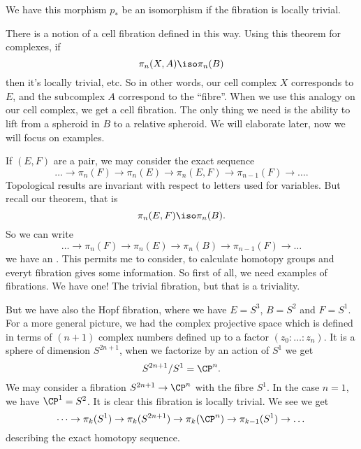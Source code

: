 \begin{thm}
We have this morphism $p_{*}$ be an isomorphism if the fibration
is locally trivial.
\end{thm}

There is a notion of a cell fibration%
%
%
 defined in this way. Using this theorem for complexes, if 
\begin{equation}
\pi_{n}(X,A)\iso\pi_{n}(B)
\end{equation}
then it's locally trivial, etc. So in other words, our cell
complex $X$ corresponds to $E$, and the subcomplex $A$ correspond
to the ``fibre''. When we use this analogy on our cell complex,
we get a cell fibration.
The only thing we need is the ability to lift from a spheroid in
$B$ to a relative spheroid. We will elaborate later, now we will
focus on examples.

If $(E,F)$ are a pair, we may consider the exact sequence
\begin{equation}
\dots\to\pi_{n}(F)\to\pi_{n}(E)\to\pi_{n}(E,F)\to\pi_{n-1}(F)\to\dots.
\end{equation}
Topological results are invariant with respect to letters used
for variables. But recall our theorem, that is
\begin{equation}
\pi_{n}(E,F)\iso\pi_{n}(B).
\end{equation}
So we can write
\begin{equation}
\dots\to\pi_{n}(F)\to\pi_{n}(E)\to\pi_{n}(B)\to\pi_{n-1}(F)\to\dots
\end{equation}
we have an .%
%
%
%
%
This permits me to consider, to calculate homotopy groups and
everyt fibration gives some information. So first of all, we need
examples of fibrations. We have one! The trivial fibration, but
that is a triviality.

But we have also the Hopf fibration, where we have $E=S^3$,
$B=S^2$ and $F=S^1$. For a more general picture, we had the
complex projective space which is defined in terms of $(n+1)$
complex numbers defined up to a factor $(z_0 : \dots : z_n)$. It
is a sphere of dimension $S^{2n+1}$, when we factorize by an
action of $S^{1}$ we get
\begin{equation}
S^{2n+1}/S^{1}=\CP^{n}.
\end{equation}
We may consider a fibration $S^{2n+1}\to\CP^{n}$ with the fibre
$S^{1}$. In the case $n=1$, we have $\CP^1=S^2$. It is clear this
fibration is locally trivial. We see we get
\begin{equation}
\dots\to\pi_{k}(S^1)\to\pi_{k}(S^{2n+1})\to\pi_{k}(\CP^{n})\to\pi_{k-1}(S^{1})\to\dots
\end{equation}
describing the exact homotopy sequence.

